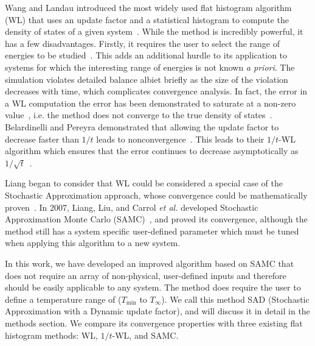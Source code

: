 \documentclass[letterpaper,twocolumn,amsmath,amssymb,pre,aps,10pt]{revtex4-1}
\begin{document}
Wang and Landau introduced the most widely used flat histogram
algorithm (WL) that uses an update factor
and a statistical histogram to compute the density of states of a given
system~\cite{wang2001determining, wang2001efficient}.  While the method
is incredibly powerful, it has a few disadvantages. Firstly, it
requires the user to select the range
of energies to be studied~\cite{landau2004new}. This adds an additional
hurdle to its application to systems for which the interesting range
of energies is not known \emph{a priori}.  The simulation
violates detailed balance albiet briefly as the size of the violation decreases
with time, which complicates convergence analysis.  In fact, the error
in a WL computation the error has been demonstrated to saturate at a
non-zero value~\cite{yan2003fast}, i.e. the method does not converge to
the true density of states~\cite{belardinelli2007wang,
belardinelli2007fast, belardinelli2008analysis,
belardinelli2014intrinsic, singh2012density}.
%
Belardinelli and Pereyra demonstrated that allowing the update factor
to decrease faster than $1/t$ leads to
nonconvergence~\cite{belardinelli2007wang}.
%
This leads to their $1/t$-WL algorithm which ensures that the error
continues to decrease asymptotically as
$1/\sqrt{t}$~\cite{belardinelli2008analysis}.

Liang began to consider that WL could be considered a special case of
the Stochastic Approximation approach, whose convergence could be
mathematically proven~\cite{liang2006theory}. In 2007, Liang, Liu, and
Carrol \emph{et al.} developed Stochastic Approximation Monte Carlo
(SAMC)~\cite{liang2007stochastic}, and proved its convergence,
although the method still has a system specific user-defined parameter
which must be tuned when applying this algorithm to a new system.

In this work, we have developed an improved algorithm based on SAMC
that does not require an array of non-physical, user-defined inputs
and therefore should be easily applicable to any system. The method
does require the user to define a temperature range of ($T_\text{min}$
to $T_\infty$).  We call this method SAD (Stochastic Approximation
with a Dynamic update factor), and will discuss it in detail in the
methods section. We compare its convergence properties with three
existing flat histogram methods: WL, $1/t$-WL, and SAMC.
\end{document}
